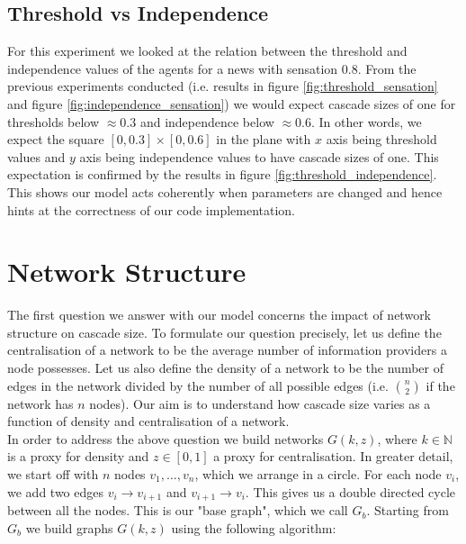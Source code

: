 \documentclass[10pt]{article}
\begin{document}
\subsection{Threshold vs Independence}\label{subsec:threshold_independence}
For this experiment we looked at the relation between the threshold and independence values of the agents for a news with sensation 0.8. From the previous experiments conducted (i.e. results in figure \ref{fig:threshold_sensation} and figure \ref{fig:independence_sensation}) we would expect cascade sizes of one for thresholds below $\approx 0.3$ and independence below $\approx 0.6$. In other words, we expect the square $[0,0.3]\times [0,0.6]$ in the plane with $x$ axis being threshold values and $y$ axis being independence values to have cascade sizes of one. This expectation is confirmed by the results in figure \ref{fig:threshold_independence}. This shows our model acts coherently when parameters are changed and hence hints at the correctness of our code implementation.

\section{Network Structure}
The first question we answer with our model concerns the impact of network structure on cascade size.
To formulate our question precisely, let us define the centralisation of a network to be the average number of information providers a node possesses. 
Let us also define the density of a network to be the number of edges in the network divided by the number of all possible edges (i.e. $n\choose{2}$ if the network has $n$ nodes). Our aim is to understand how cascade size varies as a function of density and centralisation of a network.  \\

In order to address the above question we build networks $G(k,z)$, where $k \in \mathbb{N}$ is a proxy for density and $z \in [0,1]$ a proxy for centralisation. In greater detail, we start off with $n$ nodes $v_1, \ldots ,v_n$, which we arrange in a circle. For each node $v_i$, we add two edges $v_i \rightarrow v_{i+1}$ and $v_{i+1} \rightarrow v_i$. This gives us a double directed cycle between all the nodes. This is our "base graph", which we call $G_b$. Starting from $G_b$ we build graphs $G(k,z)$ using the following algorithm: \\
\end{document}
